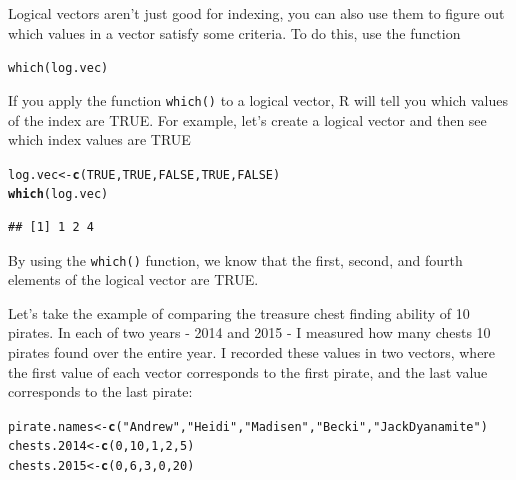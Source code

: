 \documentclass{tufte-book}\usepackage[]{graphicx}\usepackage[]{color}
\makeatletter
\newcommand{\hlnum}[1]{\textcolor[rgb]{0.686,0.059,0.569}{#1}}%
\newcommand{\hlstr}[1]{\textcolor[rgb]{0.192,0.494,0.8}{#1}}%
\newcommand{\hlstd}[1]{\textcolor[rgb]{0.345,0.345,0.345}{#1}}%
\newcommand{\hlkwb}[1]{\textcolor[rgb]{0.69,0.353,0.396}{#1}}%
\newcommand{\hlkwd}[1]{\textcolor[rgb]{0.737,0.353,0.396}{\textbf{#1}}}%
\newenvironment{kframe}{%
 \def\at@end@of@kframe{}%
 \ifinner\ifhmode%
  \def\at@end@of@kframe{\end{minipage}}%
  \begin{minipage}{\columnwidth}%
 \fi\fi%
 \def\FrameCommand##1{\hskip\@totalleftmargin \hskip-\fboxsep
 \colorbox{shadecolor}{##1}\hskip-\fboxsep
     \hskip-\linewidth \hskip-\@totalleftmargin \hskip\columnwidth}%
 \MakeFramed {\advance\hsize-\width
   \@totalleftmargin\z@ \linewidth\hsize
   \@setminipage}}%
 {\par\unskip\endMakeFramed%
 \at@end@of@kframe}
\newenvironment{knitrout}{}{} %
\newcommand{\newfun}[1]{\begin{LARGE} \begin{center} \texttt{#1} \end{center} \end{LARGE}}
\makeatother
\begin{document}
\begin{footnotesize}
Logical vectors aren't just good for indexing, you can also use them to figure out which values in a vector satisfy some criteria. To do this, use the function 

\newfun{which(log.vec)}%

If you apply the function \texttt{which()} to a logical vector, R will tell you which values of the index are TRUE. For example, let's create a logical vector and then see which index values are TRUE

\begin{knitrout}
\color{fgcolor}\begin{kframe}
\begin{alltt}
\hlstd{log.vec} \hlkwb{<-} \hlkwd{c}\hlstd{(}\hlnum{TRUE}\hlstd{,} \hlnum{TRUE}\hlstd{,} \hlnum{FALSE}\hlstd{,} \hlnum{TRUE}\hlstd{,} \hlnum{FALSE}\hlstd{)}
\hlkwd{which}\hlstd{(log.vec)}
\end{alltt}
\begin{verbatim}
## [1] 1 2 4
\end{verbatim}
\end{kframe}
\end{knitrout}

By using the \texttt{which()} function, we know that the first, second, and fourth elements of the logical vector are TRUE.

Let's take the example of comparing the treasure chest finding ability of 10 pirates. In each of two years - 2014 and 2015 - I measured how many chests 10 pirates found over the entire year. I recorded these values in two vectors, where the first value of each vector corresponds to the first pirate, and the last value corresponds to the last pirate:

\begin{footnotesize}
\begin{knitrout}
\color{fgcolor}\begin{kframe}
\begin{alltt}
\hlstd{pirate.names} \hlkwb{<-} \hlkwd{c}\hlstd{(}\hlstr{"Andrew"}\hlstd{,} \hlstr{"Heidi"}\hlstd{,} \hlstr{"Madisen"}\hlstd{,} \hlstr{"Becki"}\hlstd{,} \hlstr{"Jack Dyanamite"}\hlstd{)}
\hlstd{chests.2014} \hlkwb{<-} \hlkwd{c}\hlstd{(}\hlnum{0}\hlstd{,} \hlnum{10}\hlstd{,} \hlnum{1}\hlstd{,} \hlnum{2}\hlstd{,} \hlnum{5}\hlstd{)}
\hlstd{chests.2015} \hlkwb{<-} \hlkwd{c}\hlstd{(}\hlnum{0}\hlstd{,} \hlnum{6}\hlstd{,} \hlnum{3}\hlstd{,} \hlnum{0}\hlstd{,} \hlnum{20}\hlstd{)}
\end{alltt}
\end{kframe}
\end{knitrout}
\end{footnotesize}


\end{footnotesize}
\end{document}
